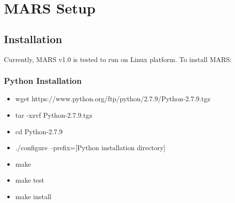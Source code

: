 \section{MARS Setup}

\subsection{Installation}


Currently, MARS v1.0 is tested to run on Linux platform. To install MARS:

\subsubsection{Python Installation}
\begin{itemize}
\item wget https://www.python.org/ftp/python/2.7.9/Python-2.7.9.tgz
\item tar -xzvf Python-2.7.9.tgz
\item cd Python-2.7.9
\item ./configure --prefix=[Python installation directory]
\item make
\item make test
\item make install

\end{itemize}



